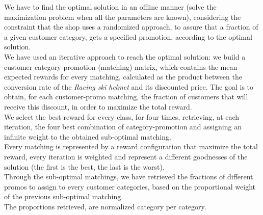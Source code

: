 We have to find the optimal solution in an offline manner (solve the maximization problem when all the parameters are known), considering the constraint that the shop uses a randomized approach, to assure that a fraction of a given customer category, gets a specified promotion, according to the optimal solution.\\ 
We have used an iterative approach to reach the optimal solution: we build a customer category-promotion (matching) matrix, which contains the mean expected rewards for every matching, calculated as the product between the conversion rate of the \textit{Racing ski helmet} and its discounted price.
The goal is to obtain, for each customer-promo matching, the fraction of customers that will receive this discount, in order to maximize the total reward.\\
We select the best reward for every class, for four times, retrieving, at each iteration, the four best combination of category-promotion and assigning an infinite weight to the obtained sub-optimal matching.\\
Every matching is represented by a reward configuration that maximize the total reward, every iteration is weighted and represent a different goodnesses of the solution (the first is the best, the last is the worst).\\
Through the sub-optimal matchings, we have retrieved the fractions of different promos to assign to every customer categories, based on the proportional weight of the previous sub-optimal matching.\\
The proportions retrieved, are normalized category per category.


